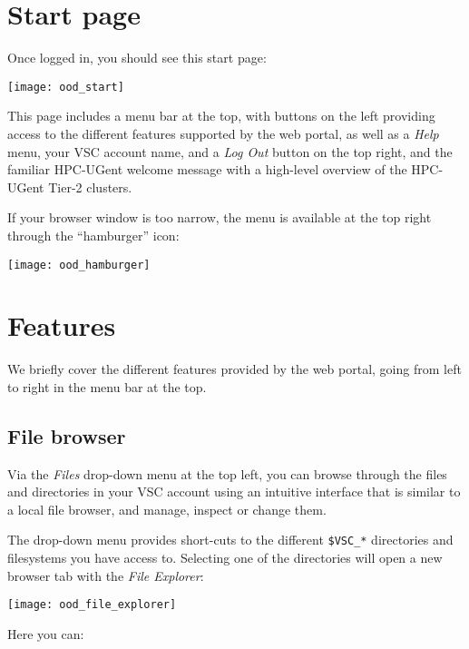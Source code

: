 \section{Start page}

Once logged in, you should see this start page:

\begin{center}
    \texttt{[image: ood\_start]}
\end{center}

This page includes a menu bar at the top, with buttons on the left providing access to the different features supported
by the web portal, as well as a \emph{Help} menu, your VSC account name, and a \emph{Log Out} button on the top right,
and the familiar HPC-UGent welcome message with a high-level overview of the HPC-UGent Tier-2 clusters.

If your browser window is too narrow, the menu is available at the top right through the ``hamburger'' icon:

\begin{center}
    \texttt{[image: ood\_hamburger]}
\end{center}


\section{Features}

We briefly cover the different features provided by the web portal, going from left to right
in the menu bar at the top.

\subsection{File browser}

Via the \emph{Files} drop-down menu at the top left, you can browse through the files and directories in your
VSC account using an intuitive interface that is similar to a local file browser, and manage, inspect or change them.

The drop-down menu provides
short-cuts to the different \lstinline|$VSC_*| directories and filesystems you have access to.
Selecting one of the directories will open a new browser tab with the \emph{File Explorer}:

\begin{center}
    \texttt{[image: ood\_file\_explorer]}
\end{center}

Here you can:

